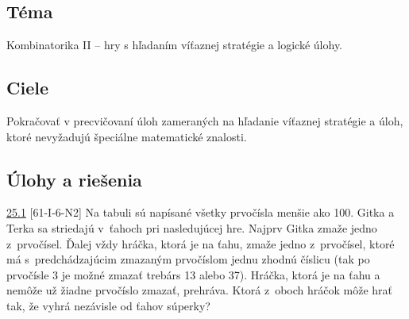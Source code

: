

\subsection*{Téma}
Kombinatorika II -- hry s hľadaním víťaznej stratégie a logické úlohy.
\subsection*{Ciele}
Pokračovať v precvičovaní úloh zameraných na hľadanie víťaznej stratégie a úloh, ktoré nevyžadujú špeciálne matematické znalosti.

\subsection*{Úlohy a riešenia}
\begin{tcolorbox}[breakable,notitle,boxrule=0pt,colback=light-gray,colframe=light-gray]\ul{25.1} [61-I-6-N2] Na tabuli sú napísané všetky prvočísla menšie ako 100. Gitka a Terka sa striedajú v~ťahoch pri nasledujúcej hre. Najprv Gitka zmaže jedno z~prvočísel. Ďalej vždy hráčka, ktorá je na ťahu, zmaže jedno z~prvočísel, ktoré má s~predchádzajúcim zmazaným prvočíslom jednu zhodnú číslicu (tak po prvočísle 3 je možné zmazať trebárs 13 alebo 37). Hráčka, ktorá je na ťahu a nemôže už žiadne prvočíslo zmazať, prehráva. Ktorá z~oboch hráčok môže hrať tak, že vyhrá nezávisle od ťahov súperky?

\end{tcolorbox}

